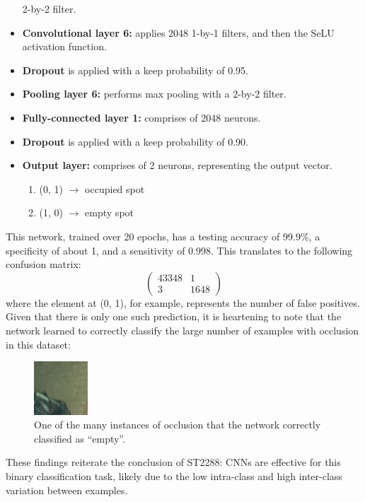\documentclass[a4paper, 11pt]{article} %
\begin{document}
\begin{itemize}
			2-by-2 
			filter.
			\item[] \textbf{Convolutional layer 6:} applies 2048 1-by-1 
			filters, 
			and then 
			the SeLU activation function.
			\item[] \textbf{Dropout} is applied with a keep probability of 0.95.
			\item[] \textbf{Pooling layer 6:} performs max pooling with a 
			2-by-2 
			filter.
			\item[] \textbf{Fully-connected layer 1:} comprises of 2048 neurons.
			\item[] \textbf{Dropout} is applied with a keep probability of 0.90.
			\item[] \textbf{Output layer:} comprises of 2 neurons, representing 
			the 
			output 
			vector.
			\vspace*{-4mm}
			\begin{enumerate}
				\setlength\itemsep{-3mm}
				\item[] (0, 1) $\rightarrow$ occupied spot
				\item[] (1, 0) $\rightarrow$ empty spot
			\end{enumerate}
		\end{itemize}
		This network, trained over 20 epochs, has a testing accuracy of 99.9\%, 
		a specificity of about 1, and a
		sensitivity of 0.998. This translates to the following confusion matrix:
		\begin{equation}
		\nonumber
		\begin{pmatrix} 43348 & 1\\ 3 & 1648 \end{pmatrix}
		\end{equation}
		\newpage
		\hspace*{-6mm}where the element at (0, 1), for example, represents the 
		number of 
		false 
		positives. Given that there is only one such prediction, it is 
		heartening to note that the network learned to correctly classify the 
		large number of examples with occlusion in this dataset:
		\begin{figure}[H]
			\centering
			\includegraphics[width=2cm]{figures/nuslot_occlusion}
			\caption{One of the many instances of occlusion that the network 
			correctly classified as ``empty''.}
		\end{figure}
		\hspace*{-6mm}These findings reiterate the conclusion of ST2288: CNNs 
		are 
		effective for 
		this binary classification task, likely due to the low intra-class 
		and high inter-class variation between examples.
\end{document}
